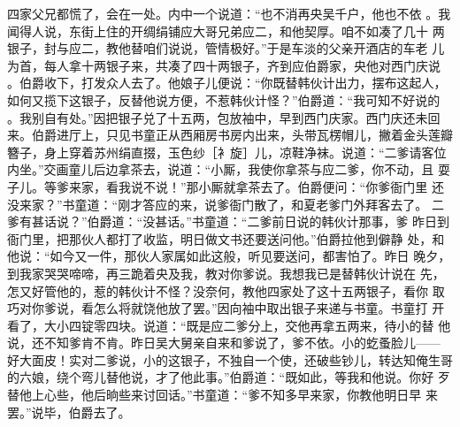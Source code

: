 四家父兄都慌了，会在一处。内中一个说道：“也不消再央吴千户，他也不依
。我闻得人说，东街上住的开绸绢铺应大哥兄弟应二，和他契厚。咱不如凑了几十
两银子，封与应二，教他替咱们说说，管情极好。”于是车淡的父亲开酒店的车老
儿为首，每人拿十两银子来，共凑了四十两银子，齐到应伯爵家，央他对西门庆说
。伯爵收下，打发众人去了。他娘子儿便说：“你既替韩伙计出力，摆布这起人，
如何又揽下这银子，反替他说方便，不惹韩伙计怪？”伯爵道：“我可知不好说的
。我别自有处。”因把银子兑了十五两，包放袖中，早到西门庆家。西门庆还未回
来。伯爵进厅上，只见书童正从西厢房书房内出来，头带瓦楞帽儿，撇着金头莲瓣
簪子，身上穿着苏州绢直掇，玉色纱［衤旋］儿，凉鞋净袜。说道：“二爹请客位
内坐。”交画童儿后边拿茶去，说道：“小厮，我使你拿茶与应二爹，你不动，且
耍子儿。等爹来家，看我说不说！”那小厮就拿茶去了。伯爵便问：“你爹衙门里
还没来家？”书童道：“刚才答应的来，说爹衙门散了，和夏老爹门外拜客去了。
二爹有甚话说？”伯爵道：“没甚话。”书童道：“二爹前日说的韩伙计那事，爹
昨日到衙门里，把那伙人都打了收监，明日做文书还要送问他。”伯爵拉他到僻静
处，和他说：“如今又一件，那伙人家属如此这般，听见要送问，都害怕了。昨日
晚夕，到我家哭哭啼啼，再三跪着央及我，教对你爹说。我想我已是替韩伙计说在
先，怎又好管他的，惹的韩伙计不怪？没奈何，教他四家处了这十五两银子，看你
取巧对你爹说，看怎么将就饶他放了罢。”因向袖中取出银子来递与书童。书童打
开看了，大小四锭零四块。说道：“既是应二爹分上，交他再拿五两来，待小的替
他说，还不知爹肯不肯。昨日吴大舅亲自来和爹说了，爹不依。小的虼蚤脸儿——
好大面皮！实对二爹说，小的这银子，不独自一个使，还破些钞儿，转达知俺生哥
的六娘，绕个弯儿替他说，才了他此事。”伯爵道：“既如此，等我和他说。你好
歹替他上心些，他后晌些来讨回话。”书童道：“爹不知多早来家，你教他明日早
来罢。”说毕，伯爵去了。

